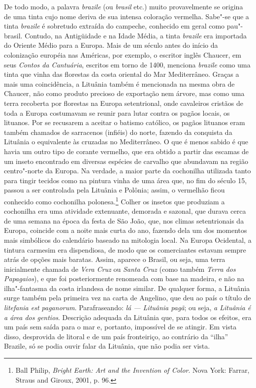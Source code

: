 De todo modo, a palavra \textit{brazile} (ou \textit{brasil} etc.) muito
provavelmente se origina de uma tinta cujo nome deriva de sua intensa
coloração vermelha. Sabe"-se que a tinta \textit{brazile} é sobretudo
extraída do campeche, conhecido em geral como pau"-brasil. Contudo, na
Antigüidade e na Idade Média, a tinta \textit{brazile} era importada do
Oriente Médio para a Europa. Mais de um século antes do início da
colonização européia nas Américas, por exemplo, o escritor inglês
Chaucer, em seus \textit{Contos da Cantuária}, escritos em torno de 1400,
menciona \textit{brazile} como uma tinta que vinha das florestas da costa
oriental do Mar Mediterrâneo. Graças a mais uma coincidência, a Lituânia
também é mencionada na mesma obra de Chaucer, não como produto precioso
de exportação nem árvore, mas como uma terra recoberta por florestas na
Europa setentrional, onde cavaleiros cristãos de toda a Europa
costumavam se reunir para lutar contra os pagãos locais, os lituanos.
Por se recusarem a aceitar o batismo católico, os pagãos lituanos eram
também chamados de sarracenos (infiéis) do norte, fazendo da conquista
da Lituânia o equivalente às cruzadas no Mediterrâneo. O que é menos
sabido é que havia um outro tipo de corante vermelho, que era obtido a
partir das escamas de um inseto encontrado em diversas espécies de
carvalho que abundavam na região centro"-norte da Europa. Na verdade, a
maior parte da cochonilha utilizada tanto para tingir tecidos como na
pintura vinha de uma área que, no fim do século 15, passou a ser
controlada pela Lituânia e Polônia; assim, o vermelhão ficou conhecido
como cochonilha polonesa.\footnote{Ball Philip, \textit{Bright Earth:
  Art and the Invention of Color}. Nova York: Farrar, Straus and Giroux,
  2001, p. 96.} Colher os insetos que produziam a cochonilha era uma
atividade extenuante, demorada e sazonal, que durava cerca de uma semana
na época da festa de São João, que, nos climas setentrionais da Europa,
coincide com a noite mais curta do ano, fazendo dela um dos momentos
mais simbólicos do calendário baseado na mitologia local. Na Europa
Ocidental, a tintura carmesim era dispendiosa, de modo que os
comerciantes estavam sempre atrás de opções mais baratas. Assim, aparece
o Brasil, ou seja, uma terra inicialmente chamada de \textit{Vera Cruz} ou
\textit{Santa Cruz} (como também \textit{Terra dos Papagaios}), e que foi
posteriormente renomeada com base na madeira, e não na ilha"-fantasma da
costa irlandesa de nome similar. De qualquer forma, a Lituânia surge
também pela primeira vez na carta de Angelino, que deu ao país o título
de \textit{litefania est paganorum}. Parafraseando: \textit{lá --- Lituânia
pagã}; ou seja, \textit{a Lituânia é a área dos gentios}. Descrição
adequada da Lituânia que, para todos os efeitos, era um país sem saída
para o mar e, portanto, impossível de se atingir. Em vista disso,
desprovida de litoral e de um país fronteiriço, ao contrário da ``ilha''
Brazile, só se podia ouvir falar da Lituânia, que não podia ser vista.

